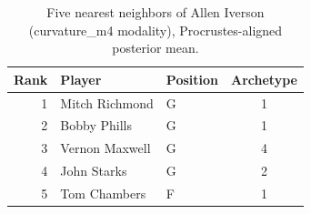 \begin{table}[htbp]
  \centering\small
  \begin{tabular}{rllc}
    \toprule
    Rank & Player & Position & Archetype \\
    \midrule
    1 & Mitch Richmond & G & 1 \\
    2 & Bobby Phills & G & 1 \\
    3 & Vernon Maxwell & G & 4 \\
    4 & John Starks & G & 2 \\
    5 & Tom Chambers & F & 1 \\
    \bottomrule
  \end{tabular}
  \caption{Five nearest neighbors of Allen Iverson (curvature_m4 modality), Procrustes-aligned posterior mean.}
  \label{tab:Allen_Iverson_neighbors_curvature_m4}
\end{table}

